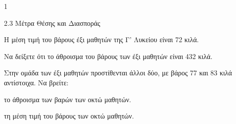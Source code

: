 \begin{ylh}{1}
    \item 2.3 Μέτρα Θέσης και Διασποράς
\end{ylh}
Η μέση τιμή του βάρους έξι μαθητών της Γ' Λυκείου είναι 72 κιλά.
\begin{alist}
    \item Να δείξετε ότι το άθροισμα του βάρους των έξι μαθητών είναι 432 κιλά. 
    \item Στην ομάδα των έξι μαθητών προστίθενται άλλοι δύο, με βάρος 77 και 83 κιλά αντίστοιχα. Να βρείτε:
    \begin{rlist}
        \item το άθροισμα των βαρών των οκτώ μαθητών. 
        \item τη μέση τιμή του βάρους των οκτώ μαθητών. 
    \end{rlist}
\end{alist}


